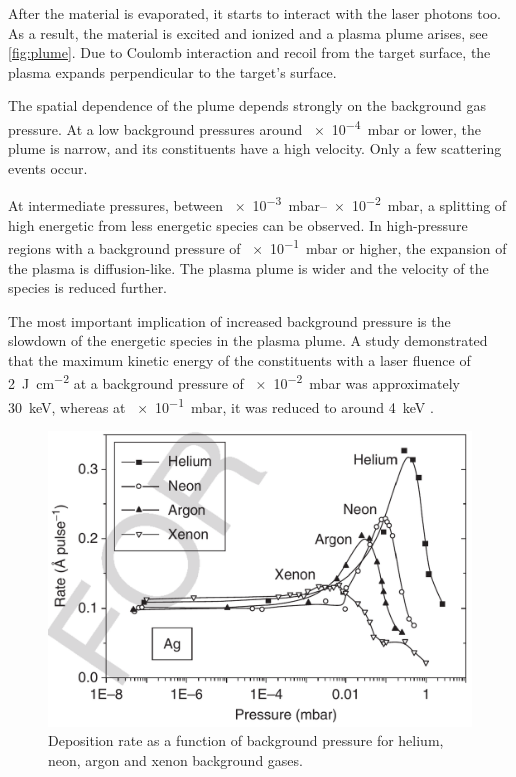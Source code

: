 After the material is evaporated, it starts to interact with the laser photons too.
As a result, the material is excited and ionized and a plasma plume arises, see 
\cref{fig:plume}.
Due to Coulomb interaction and recoil from the target surface, 
the plasma expands perpendicular to the target's surface.

The spatial dependence of the plume depends strongly on the background gas pressure.
At a low background pressures around \qty{e-4}{\milli \bar} or lower, the plume is
narrow, and its constituents have a high velocity.
Only a few scattering events occur.

At intermediate pressures, between \qtyrange{e-3}{e-2}{\milli \bar},
 a splitting of high energetic from less energetic species can be observed.
In high-pressure regions with a background pressure of \qty{e-1}{\milli \bar} or 
higher, the expansion of the plasma is diffusion-like.
The plasma plume is wider and the velocity of the species is
reduced further.

The most important implication of increased background pressure is the slowdown of 
the energetic species in the plasma plume. 
A study demonstrated that the maximum kinetic energy of the constituents
with a laser fluence of \qty{2}{\joule \per \centi \meter \squared} at a background 
pressure of \qty{e-2}{\milli \bar} was approximately \qty{30}{\kilo \electronvolt}, 
whereas at \qty{e-1}{\milli \bar}, it was reduced to around 
\qty{4}{\kilo \electronvolt} \cite{xu2014}.

\begin{figure}
	\centering
	\includegraphics[width=0.98\columnwidth]{../assets/deposition_rate.png}
	\caption{Deposition rate as a function of background pressure for helium, neon, 
	argon and xenon background gases. }
	\label{fig:pld_plasma}
\end{figure}

